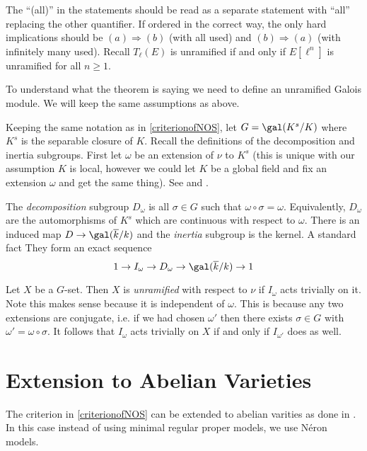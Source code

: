 \documentclass[11pt]{article}
\newcommand{\neron}{N\'{e}ron }
\begin{document}
\begin{rem}\label{somevsallremark}
	The ``(all)'' in the statements should be read as a separate statement with ``all'' replacing the other quantifier. If ordered in the correct way, the only hard implications should be $(a) \Rightarrow (b)$ (with all used) and $(b)\Rightarrow(a)$ (with infinitely many used). Recall $T_\ell(E)$ is unramified if and only if $E[\ell^n]$ is unramified for all $n\geq 1$.
\end{rem}

To understand what the theorem is saying we need to define an unramified Galois module. We will keep the same assumptions as above.

\begin{defn}
	Keeping the same notation as in \autoref{criterionofNOS}, let $G = \gal(K^{s}/K)$ where $K^s$ is the separable closure of $K$. Recall the definitions of the decomposition and inertia subgroups. First let $\omega$ be an extension of $\nu$ to $K^s$ (this is unique with our assumption $K$ is local, however we could let $K$ be a global field and fix an extension $\omega$ and get the same thing). See \cite[Ch.~2.9]{neukirch2013algebraic} and \cite[Sec.~1]{serre1968good}.
	
	The \emph{decomposition} subgroup $D_\omega$ is all $\sigma\in G$ such that $\omega\circ\sigma = \omega$. Equivalently, $D_\omega$ are the automorphisms of $K^s$ which are continuous with respect to $\omega$. There is an induced map $D \to \gal(\overline{k}/k)$ and the \emph{inertia} subgroup is the kernel. A standard fact They form an exact sequence
	$$
	1 \to I_\omega \to D_\omega \to \gal(\overline{k}/k) \to 1
	$$
	
	Let $X$ be a $G$-set. Then $X$ is \emph{unramified} with respect to $\nu$ if $I_\omega$ acts trivially on it. Note this makes sense because it is independent of $\omega$. This is because any two extensions are conjugate, i.e. if we had chosen $\omega'$ then there exists $\sigma\in G$ with $\omega' = \omega\circ\sigma$. It follows that $I_\omega$ acts trivially on $X$ if and only if $I_{\omega'}$ does as well.
\end{defn}

\section{Extension to Abelian Varieties}

The criterion in \autoref{criterionofNOS} can be extended to abelian varities as done in \cite{serre1968good}. In this case instead of using minimal regular proper models, we use \neron models.
\end{document}
